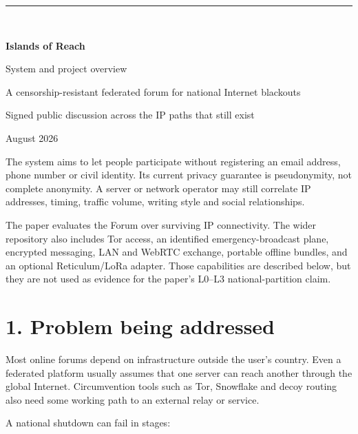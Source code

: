 \documentclass[12pt,a4paper]{article}
\begin{document}
\hypersetup{pageanchor=false}
\begin{titlepage}
  \color{jbInk}
  \vspace*{28mm}
  {\color{jbBlue}\rule{\textwidth}{2.5pt}}\\[14mm]
  {\Huge\bfseries Islands of Reach\par}
  \vspace{5mm}
  {\LARGE System and project overview\par}
  \vspace{12mm}
  {\large A censorship-resistant federated forum for national Internet blackouts\par}
  \vfill
  {\large Signed public discussion across the IP paths that still exist\par}
  \vspace{8mm}
  {\small August 2026\par}
\end{titlepage}
\hypersetup{pageanchor=true}
\setcounter{tocdepth}{1}
\tableofcontents
\clearpage
{}

The system aims to let people participate without registering an email address, phone number or civil identity. Its current privacy guarantee is pseudonymity, not complete anonymity. A server or network operator may still correlate IP addresses, timing, traffic volume, writing style and social relationships.

The paper evaluates the Forum over surviving IP connectivity. The wider repository also includes Tor access, an identified emergency-broadcast plane, encrypted messaging, LAN and WebRTC exchange, portable offline bundles, and an optional Reticulum/LoRa adapter. Those capabilities are described below, but they are not used as evidence for the paper's L0--L3 national-partition claim.

\section*{1. Problem being addressed}
Most online forums depend on infrastructure outside the user's country. Even a federated platform usually assumes that one server can reach another through the global Internet. Circumvention tools such as Tor, Snowflake and decoy routing also need some working path to an external relay or service.

A national shutdown can fail in stages:
\end{document}
